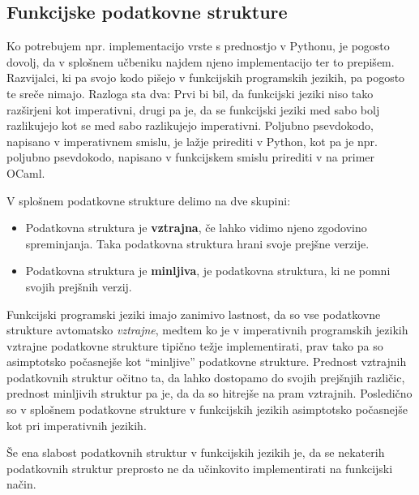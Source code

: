 \documentclass[mat1, tisk]{fmfdelo}
\begin{document}

\subsection{Funkcijske podatkovne strukture}

Ko potrebujem npr. implementacijo vrste s prednostjo v Pythonu, je pogosto dovolj, da v splošnem učbeniku najdem njeno implementacijo ter to prepišem. 
Razvijalci, ki pa svojo kodo pišejo v funkcijskih programskih jezikih, pa pogosto te sreče nimajo. 
Razloga sta dva: Prvi bi bil, da funkcijski jeziki niso tako razširjeni kot imperativni, drugi pa je, da se funkcijski jeziki med sabo bolj razlikujejo kot se med sabo razlikujejo imperativni. 
Poljubno psevdokodo, napisano v imperativnem smislu, je lažje prirediti v Python, kot pa je npr. poljubno psevdokodo, napisano v funkcijskem smislu prirediti v na primer OCaml.

\begin{definicija}
V splošnem podatkovne strukture delimo na dve skupini:
\begin{itemize}
  \item Podatkovna struktura je \textbf{vztrajna}, če lahko vidimo njeno zgodovino spreminjanja. Taka podatkovna struktura hrani svoje prejšne verzije.
  \item Podatkovna struktura je \textbf{minljiva}, je podatkovna struktura, ki ne pomni svojih prejšnih verzij.
\end{itemize}
\end{definicija}

Funkcijski programski jeziki imajo zanimivo lastnost, da so vse podatkovne strukture avtomatsko \textit{vztrajne}, 
medtem ko je v imperativnih programskih jezikih vztrajne podatkovne strukture tipično težje implementirati, prav tako pa so asimptotsko počasnejše kot ``minljive'' podatkovne strukture. 
Prednost vztrajnih podatkovnih struktur očitno ta, da lahko dostopamo do svojih prejšnjih različic, prednost minljivih struktur pa je, da da so hitrejše na pram vztrajnih. 
Posledično so v splošnem podatkovne strukture v funkcijskih jezikih asimptotsko počasnejše kot pri imperativnih jezikih.

Še ena slabost podatkovnih struktur v funkcijskih jezikih je, da se nekaterih podatkovnih struktur preprosto ne da učinkovito implementirati na funkcijski način.
\end{document}
